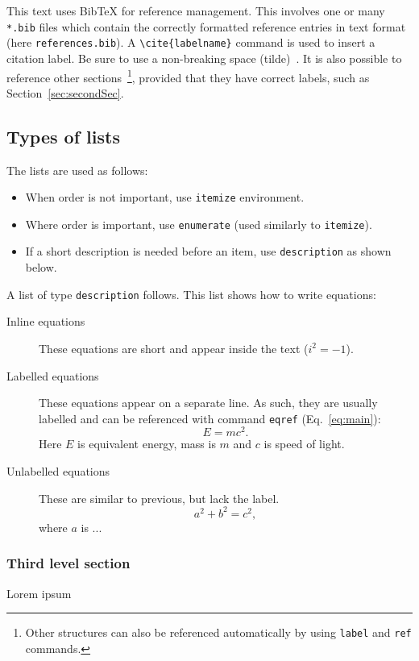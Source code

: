 This text uses BibTeX for reference management. This involves one or many \texttt{*.bib} files which contain the correctly formatted reference entries in text format (here \texttt{references.bib}). A \verb!\cite{labelname}! command is used to insert a citation label. Be sure to use a non-breaking space (tilde)~\cite{Once2017,Somebody2016}. It is also possible to reference other sections~\footnote{Other structures can also be referenced automatically by using \texttt{label} and \texttt{ref} commands.}, provided that they have correct labels, such as Section~\ref{sec:secondSec}.


\subsection{Types of lists}
The lists are used as follows:
\begin{itemize}
\item When order is not important, use \texttt{itemize} environment. 
\item Where order is important, use \texttt{enumerate} (used similarly to \texttt{itemize}).
\item If a short description is needed before an item, use \texttt{description} as shown below.
\end{itemize} 

A list of type \texttt{description} follows. This list shows how to write equations:
\begin{description}
\item [Inline equations] These equations are short and appear inside the text ($i^2=-1$).
\item [Labelled equations] These equations appear on a separate line. As such, they are usually labelled and can be referenced with command \texttt{eqref} (Eq.~\eqref{eq:main}):
\begin{equation}\label{eq:main}
E=mc^2.
\end{equation}
Here $E$ is equivalent energy, mass is $m$ and $c$ is speed of light.
\item [Unlabelled equations] These are similar to previous, but lack the label.
\begin{equation*} %
a^2 + b^2 = c^2,
\end{equation*}
where $a$ is ...
\end{description}


\subsubsection{Third level section}
Lorem ipsum




